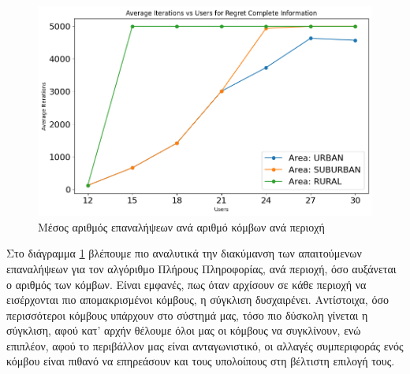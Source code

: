 \begin{figure}[ht]
    \centering
    \includegraphics[width=\textwidth]{figures/chapter4/RCI_Iterations_vs_Users_per_Area.png}
    \caption{Μέσος αριθμός επαναλήψεων ανά αριθμό κόμβων ανά περιοχή}
    \label{fig45}
\end{figure}

Στο διάγραμμα \ref{fig45} βλέπουμε πιο αναλυτικά την διακύμανση των απαιτούμενων επαναλήψεων για τον αλγόριθμο Πλήρους Πληροφορίας, ανά περιοχή, όσο αυξάνεται ο αριθμός των κόμβων. Είναι εμφανές, πως όταν αρχίσουν σε κάθε περιοχή να εισέρχονται πιο απομακρισμένοι κόμβους, η σύγκλιση δυσχαιρένει. Αντίστοιχα, όσο περισσότεροι κόμβους υπάρχουν στο σύστημά μας, τόσο πιο δύσκολη γίνεται η σύγκλιση, αφού κατ' αρχήν θέλουμε όλοι μας οι κόμβους να συγκλίνουν, ενώ επιπλέον, αφού το περιβάλλον μας είναι ανταγωνιστικό, οι αλλαγές συμπεριφοράς ενός κόμβου είναι πιθανό να επηρεάσουν και τους υπολοίπους στη βέλτιστη επιλογή τους.